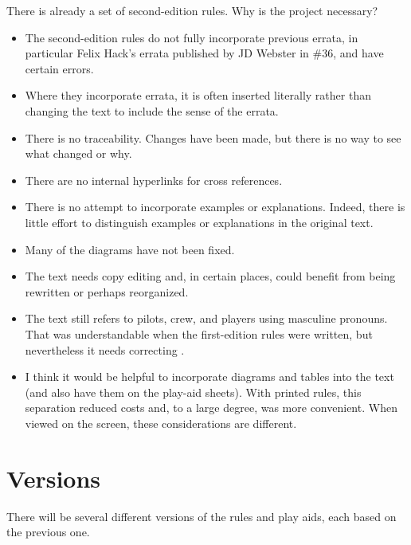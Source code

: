 \documentclass[10pt]{article}
\begin{document}
There is already a set of second-edition rules. Why is the project necessary?
\begin{itemize}
    \item The second-edition rules do not fully incorporate previous errata, in particular Felix Hack's errata published by JD Webster in {\APJ} \#36, and have certain errors.
    \item Where they incorporate errata, it is often inserted literally rather than changing the text to include the sense of the errata.
    \item There is no traceability. Changes have been made, but there is no way to see what changed or why.
    \item There are no internal hyperlinks for cross references.
    \item There is no attempt to incorporate examples or explanations. Indeed, there is little effort to distinguish examples or explanations in the original text.
    \item Many of the diagrams have not been fixed.
    \item The text needs copy editing and, in certain places, could benefit from being rewritten or perhaps reorganized.
    \item The text still refers to pilots, crew, and players using masculine pronouns. That was understandable when the first-edition rules were written, but nevertheless it needs correcting .
    \item I think it would be helpful to incorporate diagrams and tables into the text (and also have them on the play-aid sheets). With printed rules, this separation reduced costs and, to a large degree, was more convenient. When viewed on the screen, these considerations are different.
\end{itemize}

\section*{Versions}

There will be several different versions of the rules and play aids, each based on the previous one.
\end{document}
